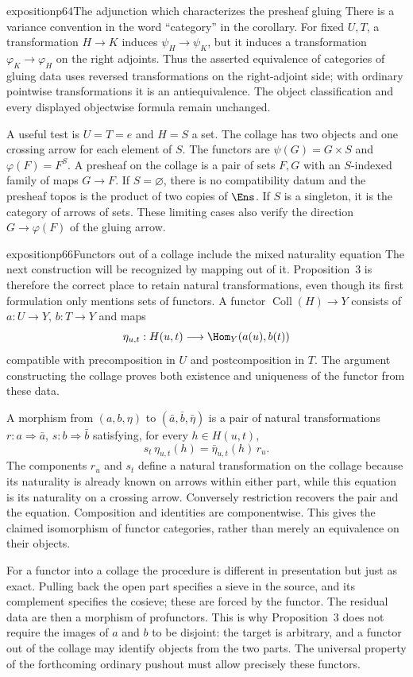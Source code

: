 \begin{dcomment}{exposition}{p64}{The adjunction which characterizes the presheaf gluing}
There is a variance convention in the word ``category'' in the corollary. For fixed $U,T$, a transformation $H\to K$ induces $\psi_H\to\psi_K$, but it induces a transformation $\varphi_K\to\varphi_H$ on the right adjoints. Thus the asserted equivalence of categories of gluing data uses reversed transformations on the right-adjoint side; with ordinary pointwise transformations it is an antiequivalence. The object classification and every displayed objectwise formula remain unchanged.

A useful test is $U=T=e$ and $H=S$ a set. The collage has two objects and one crossing arrow for each element of $S$. The functors are $\psi(G)=G\times S$ and $\varphi(F)=F^S$. A presheaf on the collage is a pair of sets $F,G$ with an $S$-indexed family of maps $G\to F$. If $S=\varnothing$, there is no compatibility datum and the presheaf topos is the product of two copies of $\Ens$. If $S$ is a singleton, it is the category of arrows of sets. These limiting cases also verify the direction $G\to\varphi(F)$ of the gluing arrow.
\end{dcomment}

\begin{dcomment}{exposition}{p66}{Functors out of a collage include the mixed naturality equation}
The next construction will be recognized by mapping out of it. Proposition~3 is therefore the correct place to retain natural transformations, even though its first formulation only mentions sets of functors. A functor $\operatorname{Coll}(H)\to Y$ consists of $a:U\to Y$, $b:T\to Y$ and maps
\[
 \eta_{u,t}:H(u,t)\longrightarrow\Hom_Y(a(u),b(t))
\]
compatible with precomposition in $U$ and postcomposition in $T$. The argument constructing the collage proves both existence and uniqueness of the functor from these data.

A morphism from $(a,b,\eta)$ to $(\bar a,\bar b,\bar\eta)$ is a pair of natural transformations $r:a\Rightarrow\bar a$, $s:b\Rightarrow\bar b$ satisfying, for every $h\in H(u,t)$,
\[
 s_t\,\eta_{u,t}(h)=\bar\eta_{u,t}(h)\,r_u.
\]
The components $r_u$ and $s_t$ define a natural transformation on the collage because its naturality is already known on arrows within either part, while this equation is its naturality on a crossing arrow. Conversely restriction recovers the pair and the equation. Composition and identities are componentwise. This gives the claimed isomorphism of functor categories, rather than merely an equivalence on their objects.

For a functor into a collage the procedure is different in presentation but just as exact. Pulling back the open part specifies a sieve in the source, and its complement specifies the cosieve; these are forced by the functor. The residual data are then a morphism of profunctors. This is why Proposition~3 does not require the images of $a$ and $b$ to be disjoint: the target is arbitrary, and a functor out of the collage may identify objects from the two parts. The universal property of the forthcoming ordinary pushout must allow precisely these functors.
\end{dcomment}


